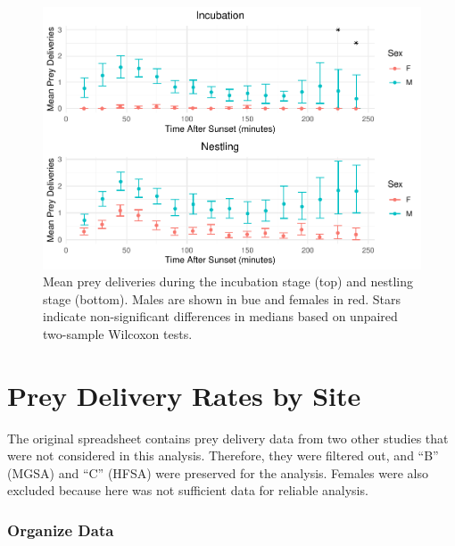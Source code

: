 \documentclass[]{article}
\newenvironment{Shaded}{\begin{snugshade}}{\end{snugshade}}
\newcommand{\KeywordTok}[1]{\textcolor[rgb]{0.13,0.29,0.53}{\textbf{#1}}}
\newcommand{\NormalTok}[1]{#1}
\newcommand{\OperatorTok}[1]{\textcolor[rgb]{0.81,0.36,0.00}{\textbf{#1}}}
\newcommand{\StringTok}[1]{\textcolor[rgb]{0.31,0.60,0.02}{#1}}
\begin{document}
\begin{figure}
\centering
\includegraphics{../manuscript/figures/plot_sex-1.pdf}
\caption{Mean prey deliveries during the incubation stage (top) and
nestling stage (bottom). Males are shown in bue and females in red.
Stars indicate non-significant differences in medians based on unpaired
two-sample Wilcoxon tests.}
\end{figure}

\hypertarget{prey-delivery-rates-by-site}{%
\section{Prey Delivery Rates by
Site}\label{prey-delivery-rates-by-site}}

The original spreadsheet contains prey delivery data from two other
studies that were not considered in this analysis. Therefore, they were
filtered out, and ``B'' (MGSA) and ``C'' (HFSA) were preserved for the
analysis. Females were also excluded because here was not sufficient
data for reliable analysis.

\begin{Shaded}
\end{Shaded}

\hypertarget{organize-data-1}{%
\subsubsection{Organize Data}\label{organize-data-1}}
\end{document}
